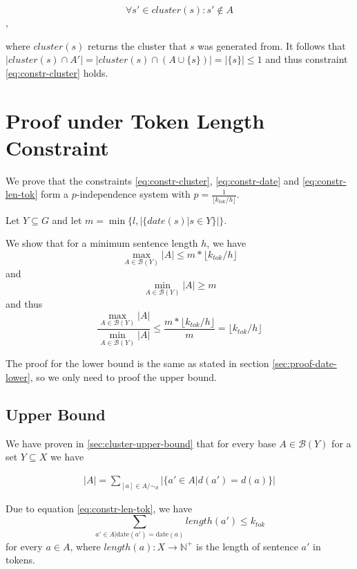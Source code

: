 \documentclass[a4paper,BCOR=10mm]{report}
\numberwithin{lemma}{chapter}
\numberwithin{definition}{chapter}
\begin{document}
\begin{appendices}
\begin{equation}
\forall s' \in \mathit{cluster}(s) : s' \not\in A
\end{equation},

where $\mathit{cluster}(s)$ returns the cluster that $s$ was generated from.
It follows that $|\mathit{cluster}(s) \cap A'| = |\mathit{cluster}(s) \cap (A \cup \{ s \})| = |\{s\}| \leq 1$ and thus constraint \ref{eq:constr-cluster} holds.


\section{Proof under Token Length Constraint} \label{sec:proof-token-constr}

We prove that the constraints \ref{eq:constr-cluster}, \ref{eq:constr-date} and \ref{eq:constr-len-tok} form a $p$-independence system with $p = \frac{1}{\lfloor k_{tok} / h \rfloor}$.

Let $Y \subseteq G$ and let $m = \min \{ l, |\{\mathit{date}(s) | s \in Y\}| \}$.

We show that for a minimum sentence length $h$, we have 
\begin{equation}
\max_{A \in \mathcal{B}(Y)} |A| \leq m * \lfloor k_{tok} / h \rfloor
\end{equation}
and
\begin{equation}
    \min_{A \in \mathcal{B}(Y)} |A| \geq m
\end{equation}
and thus
\begin{equation}
\frac{\max_{A \in \mathcal{B}(Y)} |A|}{\min_{A \in \mathcal{B}(Y)} |A|}
\leq \frac{m * \lfloor k_{tok} / h \rfloor}{m} = \lfloor k_{tok} / h \rfloor
\end{equation}

The proof for the lower bound is the same as stated in section \ref{sec:proof-date-lower}, so we only need to proof the upper bound.

\subsection{Upper Bound}

We have proven in \ref{sec:cluster-upper-bound} that for every base $A \in \mathcal{B}(Y)$ for a set $Y \subseteq X$ we have

\begin{align}
|A| = \sum_{[a] \in A/\sim_d} |\{ a' \in A | d(a') = d(a) \}|
\end{align}

Due to equation \ref{eq:constr-len-tok}, we have
\begin{equation}
\sum_{ a' \in A | \text{date}(a') = \text{date}(a)} \mathit{length}(a') \leq k_{tok}
\end{equation}
for every $a \in A$, where $\mathit{length}(a) : X \rightarrow \mathbb{N}^+$ is the length of sentence $a'$ in tokens.


\end{appendices}
\end{document}
